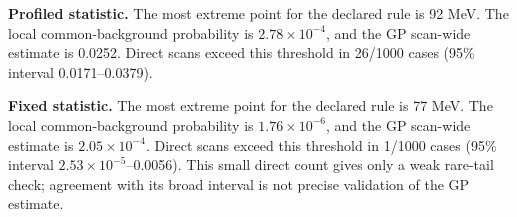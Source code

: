 \textbf{Profiled statistic.} The most extreme point for the declared rule is 92 MeV. The local common-background probability is $2.78\times10^{-4}$, and the GP scan-wide estimate is 0.0252. Direct scans exceed this threshold in 26/1000 cases (95\% interval 0.0171--0.0379).

\textbf{Fixed statistic.} The most extreme point for the declared rule is 77 MeV. The local common-background probability is $1.76\times10^{-6}$, and the GP scan-wide estimate is $2.05\times10^{-4}$. Direct scans exceed this threshold in 1/1000 cases (95\% interval $2.53\times10^{-5}$--0.0056). This small direct count gives only a weak rare-tail check; agreement with its broad interval is not precise validation of the GP estimate.
